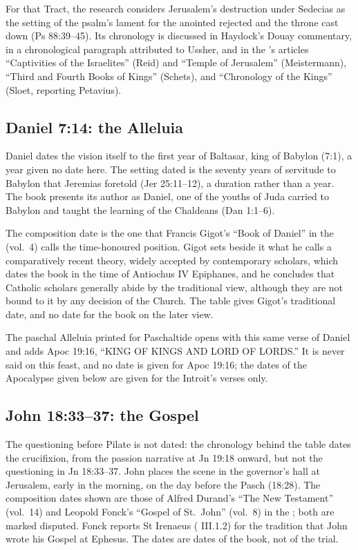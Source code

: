 For that Tract, the research considers Jerusalem's destruction under Sedecias
as the setting of the psalm's lament for the anointed rejected and the
throne cast down (Ps 88:39--45). Its chronology is discussed in
Haydock's Douay commentary, in a chronological paragraph attributed to Ussher,
and in the
's articles ``Captivities of the Israelites''
(Reid) and ``Temple of Jerusalem'' (Meistermann), ``Third and Fourth Books of
Kings'' (Schets), and ``Chronology of the Kings'' (Sloet, reporting Petavius).

\subsection{Daniel 7:14: the Alleluia}
\label{sec:date-daniel}

Daniel dates the vision itself to the first year of Baltasar, king of Babylon
(7:1), a year given no date here. The setting dated is the seventy years of
servitude to Babylon that Jeremias foretold (Jer 25:11--12), a duration rather
than a year. The book
presents its author as Daniel, one of the youths of Juda carried to Babylon
and taught the learning of the Chaldeans (Dan 1:1--6).

The composition date is the one that Francis Gigot's ``Book of Daniel''
in the  (vol.~4) calls the time-honoured position.
Gigot sets beside it what he calls a comparatively recent theory, widely
accepted by contemporary scholars, which dates the book in the time of
Antiochus IV Epiphanes, and he concludes that Catholic scholars generally
abide by the traditional view, although they are not bound to it by any
decision of the Church. The table gives Gigot's traditional date, and no date
for the book on the later view.

The paschal Alleluia printed for Paschaltide opens with this same verse of
Daniel and adds Apoc 19:16, ``KING OF KINGS AND LORD OF LORDS.'' It is never
said on this feast, and no date is given for Apoc 19:16; the dates of the
Apocalypse given below are given for the Introit's verses only.

\subsection{John 18:33--37: the Gospel}
\label{sec:date-john}

The questioning before Pilate is not dated: the chronology behind the table
dates the crucifixion, from the passion narrative at Jn 19:18 onward, but not
the questioning in Jn 18:33--37. John places the scene in the governor's hall at Jerusalem, early in the
morning, on the day before the Pasch (18:28). The composition dates shown are
those of Alfred Durand's ``The New Testament'' (vol.~14) and Leopold Fonck's
``Gospel of St.~John'' (vol.~8) in the ; both are
marked disputed. Fonck reports St Irenaeus ( III.1.2)
for the tradition that John wrote his Gospel at Ephesus. The dates are dates of
the book, not of the trial.

